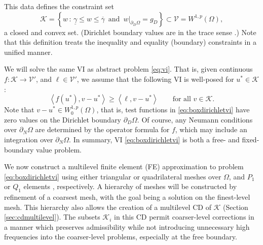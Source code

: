 \documentclass[letterpaper,final,12pt,reqno]{amsart}
\theoremstyle{cstyle}
\theoremstyle{cstyle*}
\theoremstyle{dstyle}
\numberwithin{equation}{section}
\numberwithin{figure}{section}
\numberwithin{table}{section}
\numberwithin{theorem}{section}
\newcommand{\cK}{\mathcal{K}}
\newcommand{\cV}{\mathcal{V}}
\newcommand{\ip}[2]{\left<#1,#2\right>}
\begin{document}
This data defines the constraint set
\begin{equation}
\cK = \left\{w\,:\,\underline{\gamma} \le w \le \overline{\gamma} \, \text{ and }\, w\big|_{\partial_D \Omega} = g_D\right\} \subset \cV =W^{1,p}(\Omega),
\end{equation}
a closed and convex set.  (Dirichlet boundary values are in the trace sense \cite{Evans2010}.)  Note that this definition treats the inequality and equality (boundary) constraints in a unified manner.

We will solve the same VI as abstract problem \eqref{eq:vi}.  That is, given continuous $f:\cK \to \cV'$, and $\ell \in \cV'$, we assume that the following VI is well-posed for $u^*\in \cK$:
\begin{equation}
\ip{f(u^*)}{v-u^*} \ge \ip{\ell}{v-u^*} \qquad \text{for all } v\in \cK. \label{eq:boxdirichletvi}
\end{equation}
Note that $v-u^* \in W_0^{1,p}(\Omega)$, that is, test functions in \eqref{eq:boxdirichletvi} have zero values on the Dirichlet boundary $\partial_D\Omega$.  Of course, any Neumann conditions over $\partial_N \Omega$ are determined by the operator formula for $f$, which may include an integration over $\partial_N\Omega$.  In summary, VI \eqref{eq:boxdirichletvi} is both a free- and fixed-boundary value problem.

We now construct a multilevel finite element (FE) approximation to problem \eqref{eq:boxdirichletvi} using either triangular or quadrilateral meshes over $\Omega$, and $P_1$ or $Q_1$ elements \cite{Elmanetal2014}, respectively.  A hierarchy of meshes will be constructed by refinement of a coarsest mesh, with the goal being a solution on the finest-level mesh.  This hierarchy also allows the creation of a multilevel CD of $\cK$ (Section \ref{sec:cdmultilevel}).  The subsets $\cK_i$ in this CD permit coarser-level corrections in a manner which preserves admissibility while not introducing unnecessary high frequencies into the coarser-level problems, especially at the free boundary.
\end{document}
